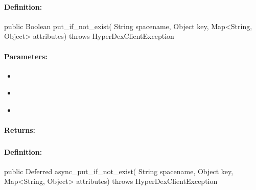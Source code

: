 \paragraph{Definition:}
\begin{javacode}
public Boolean put_if_not_exist(
        String spacename,
        Object key,
        Map<String, Object> attributes) throws HyperDexClientException
\end{javacode}

\paragraph{Parameters:}
\begin{itemize}[noitemsep]
\item {}\\

\item {}\\

\item {}\\

\end{itemize}

\paragraph{Returns:}


\pagebreak
\subsubsection{}
\label{api:java:async_put_if_not_exist}


\paragraph{Definition:}
\begin{javacode}
public Deferred async_put_if_not_exist(
        String spacename,
        Object key,
        Map<String, Object> attributes) throws HyperDexClientException
\end{javacode}


